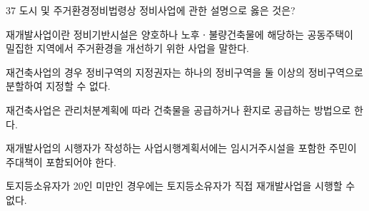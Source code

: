 \begin{question}{37}
도시 및 주거환경정비법령상 정비사업에 관한 설명으로 옳은 것은?
\begin{choices}
  \item 재개발사업이란 정비기반시설은 양호하나 노후ㆍ불량건축물에 해당하는 공동주택이 밀집한 지역에서 주거환경을 개선하기 위한 사업을 말한다.
  \item 재건축사업의 경우 정비구역의 지정권자는 하나의 정비구역을 둘 이상의 정비구역으로 분할하여 지정할 수 없다.
  \item 재건축사업은 관리처분계획에 따라 건축물을 공급하거나 환지로 공급하는 방법으로 한다.
  \item 재개발사업의 시행자가 작성하는 사업시행계획서에는 임시거주시설을 포함한 주민이 주대책이 포함되어야 한다.
  \item 토지등소유자가 20인 미만인 경우에는 토지등소유자가 직접 재개발사업을 시행할 수 없다.
\end{choices}
\end{question}
